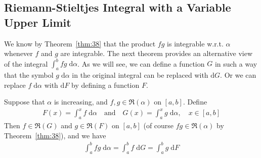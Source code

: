\documentclass[thmcnt=section, 12pt]{my-elegantbook}
\begin{document}

\subsection{Riemann-Stieltjes Integral with a Variable Upper Limit}

We know by Theorem~\ref{thm:38} that the product $fg$ is integrable w.r.t. $\alpha$ whenever $f$ and $g$ are integrable. The next theorem provides an alternative view of the integral $\int_{a}^{b} f g \; \mathrm{d}\alpha$. As we will see, we can define a function $G$ in such a way that the symbol $g \; \mathrm{d}\alpha$ in the original integral can be replaced with $\mathrm{d}G$. Or we can replace $f \; \mathrm{d}\alpha$ with $\mathrm{d}F$ by defining a function $F$.

\begin{theorem} \label{thm:39}
    Suppose that $\alpha$ is increasing, and $f, g \in \mathfrak{R}(\alpha)$ on $[a, b]$. Define
    \begin{align*}
        F(x) = \int_{a}^{x} f \; \mathrm{d}\alpha
        \quad\text{and}\quad
        G(x) = \int_{a}^{x} g \; \mathrm{d}\alpha,
        \quad x \in [a, b]
    \end{align*}
    Then $f \in \mathfrak{R}(G)$ and $g \in \mathfrak{R}(F)$ on $[a, b]$ (of course $fg \in \mathfrak{R}(\alpha)$ by Theorem~\ref{thm:38}), and we have
    \begin{align*}
        \int_{a}^{b} fg \; \mathrm{d}\alpha
        = \int_{a}^{b} f \; \mathrm{d}G
        = \int_{a}^{b} g \; \mathrm{d}F
    \end{align*}
\end{theorem}
\end{document}
